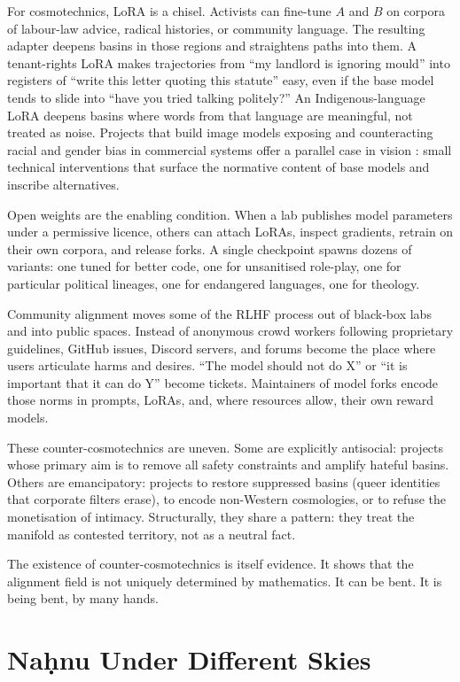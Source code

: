 \documentclass[12pt,a4paper]{article}
\begin{document}
For cosmotechnics, LoRA is a chisel. Activists can fine-tune $A$ and $B$ on corpora of labour-law advice, radical histories, or community language. The resulting adapter deepens basins in those regions and straightens paths into them. A tenant-rights LoRA makes trajectories from ``my landlord is ignoring mould'' into registers of ``write this letter quoting this statute'' easy, even if the base model tends to slide into ``have you tried talking politely?'' An Indigenous-language LoRA deepens basins where words from that language are meaningful, not treated as noise. Projects that build image models exposing and counteracting racial and gender bias in commercial systems offer a parallel case in vision \cite{mtreview-data}: small technical interventions that surface the normative content of base models and inscribe alternatives.

Open weights are the enabling condition. When a lab publishes model parameters under a permissive licence, others can attach LoRAs, inspect gradients, retrain on their own corpora, and release forks. A single checkpoint spawns dozens of variants: one tuned for better code, one for unsanitised role-play, one for particular political lineages, one for endangered languages, one for theology.

Community alignment moves some of the RLHF process out of black-box labs and into public spaces. Instead of anonymous crowd workers following proprietary guidelines, GitHub issues, Discord servers, and forums become the place where users articulate harms and desires. ``The model should not do X'' or ``it is important that it can do Y'' become tickets. Maintainers of model forks encode those norms in prompts, LoRAs, and, where resources allow, their own reward models.

These counter-cosmotechnics are uneven. Some are explicitly antisocial: projects whose primary aim is to remove all safety constraints and amplify hateful basins. Others are emancipatory: projects to restore suppressed basins (queer identities that corporate filters erase), to encode non-Western cosmologies, or to refuse the monetisation of intimacy. Structurally, they share a pattern: they treat the manifold as contested territory, not as a neutral fact.

The existence of counter-cosmotechnics is itself evidence. It shows that the alignment field is not uniquely determined by mathematics. It can be bent. It is being bent, by many hands.

\section{Na\d{h}nu Under Different Skies}
\end{document}
